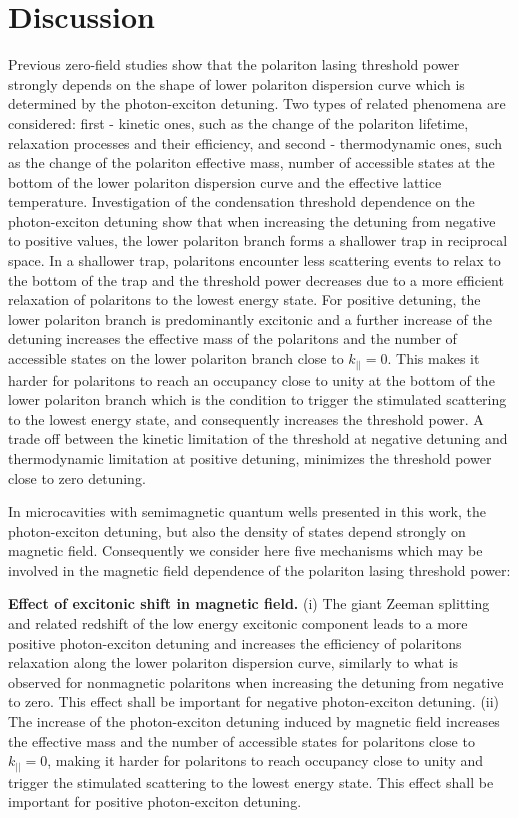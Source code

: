 \documentclass[amssymb,prb,twocolumn,floats,amsmath]{revtex4}
\begin{document}
\section{Discussion}

Previous zero-field studies show that the polariton lasing threshold power strongly depends on the shape of lower polariton dispersion curve which is determined by the photon-exciton detuning. \cite{kasprzak_PRL2008, Wertz_APL2009} Two types of related phenomena are considered: first - kinetic ones, such as the change of the polariton lifetime, relaxation processes and their efficiency, and second - thermodynamic ones, such as the change of the polariton effective mass, number of accessible states at the bottom of the lower polariton dispersion curve and the effective lattice temperature. \cite{kasprzak_PRL2008} Investigation of the condensation threshold dependence on the photon-exciton detuning show\cite{kasprzak_PRL2008, Wertz_APL2009} that when increasing the detuning from negative to positive values, the lower polariton branch forms a shallower trap in reciprocal space. In a shallower trap, polaritons encounter less scattering events to relax to the bottom of the trap and the threshold power decreases due to a more efficient relaxation of polaritons to the lowest energy state. For positive detuning, the lower polariton branch is predominantly excitonic and a further increase of the detuning increases the effective mass of the polaritons and the number of accessible states on the lower polariton branch close to $k_{||}=0$. This makes it harder for polaritons to reach an occupancy close to unity at the bottom of the lower polariton branch  which is the condition to trigger the stimulated scattering to the lowest energy state, and consequently increases the threshold power. A trade off between the kinetic limitation of the threshold at negative detuning and thermodynamic limitation at positive detuning, minimizes the threshold power close to zero detuning.\cite{kasprzak_PRL2008, Wertz_APL2009}

In microcavities with semimagnetic quantum wells presented in this work, the photon-exciton detuning, but also the density of states depend strongly on magnetic field.\cite{Mirek_PRB2017}  Consequently we consider here five mechanisms which may be involved in the magnetic field dependence of the polariton lasing threshold power:


\textbf{Effect of excitonic shift in magnetic field.} (i) The giant Zeeman splitting and related redshift of the low energy excitonic component leads to a more positive photon-exciton detuning and increases the efficiency of polaritons relaxation along the lower polariton dispersion curve, similarly to what is observed for nonmagnetic polaritons when increasing the detuning from negative to zero.\cite{kasprzak_PRL2008, Wertz_APL2009} This effect shall be important for negative photon-exciton detuning. (ii) The increase of the photon-exciton detuning induced by magnetic field  increases the effective mass and the number of accessible states for polaritons close to $k_{||}=0$,  making it harder for polaritons to reach occupancy close to unity and trigger the stimulated scattering to the lowest energy state. This effect shall be important for positive photon-exciton detuning.
\end{document}
